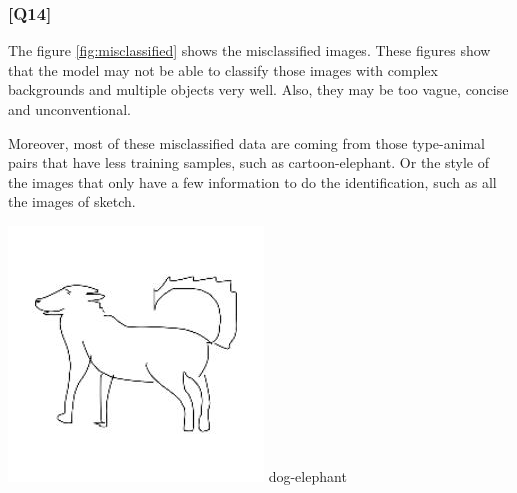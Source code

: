 \documentclass{article}
\begin{document}
\subsubsection*{[Q14]}

The figure \ref{fig:misclassified} shows the misclassified images.
These figures show that the model may not be able to classify those images with complex backgrounds and multiple objects very well.
Also, they may be too vague, concise and unconventional.

Moreover, most of these misclassified data are coming from those type-animal pairs that have less training samples, such as cartoon-elephant.
Or the style of the images that only have a few information to do the identification, such as all the images of sketch.

\begin{center}
    \noindent 
    \begin{minipage}{0.142\textwidth}
        \includegraphics[width=\linewidth]{./pic/misclassified_r0_p1_1641.jpg}
        dog-elephant
    \end{minipage}%
    \begin{minipage}{0.142\textwidth}

\end{minipage}
\end{center}
\end{document}
